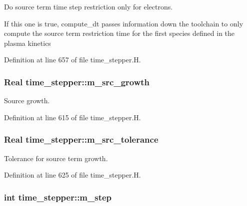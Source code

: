 Do source term time step restriction only for electrons. 

If this one is true, compute\+\_\+dt passes information down the toolchain to only compute the source term restriction time for the first species defined in the plasma kinetics 

Definition at line 657 of file time\+\_\+stepper.\+H.

\subsubsection[{\texorpdfstring{m\+\_\+src\+\_\+growth}{m_src_growth}}]{\setlength{\rightskip}{0pt plus 5cm}Real time\+\_\+stepper\+::m\+\_\+src\+\_\+growth\hspace{0.3cm}{\ttfamily [protected]}}\hypertarget{classtime__stepper_a06ffa5dffab8e8cacef26bc640f4a265}{}\label{classtime__stepper_a06ffa5dffab8e8cacef26bc640f4a265}


Source growth. 



Definition at line 615 of file time\+\_\+stepper.\+H.

\subsubsection[{\texorpdfstring{m\+\_\+src\+\_\+tolerance}{m_src_tolerance}}]{\setlength{\rightskip}{0pt plus 5cm}Real time\+\_\+stepper\+::m\+\_\+src\+\_\+tolerance\hspace{0.3cm}{\ttfamily [protected]}}\hypertarget{classtime__stepper_a19f732138cbbb2be42a8d5486aa4208f}{}\label{classtime__stepper_a19f732138cbbb2be42a8d5486aa4208f}


Tolerance for source term growth. 



Definition at line 625 of file time\+\_\+stepper.\+H.

\subsubsection[{\texorpdfstring{m\+\_\+step}{m_step}}]{\setlength{\rightskip}{0pt plus 5cm}int time\+\_\+stepper\+::m\+\_\+step\hspace{0.3cm}{\ttfamily [protected]}}\hypertarget{classtime__stepper_a5a4bd274325d52eef716b6c465cc3a9d}{}\label{classtime__stepper_a5a4bd274325d52eef716b6c465cc3a9d}


